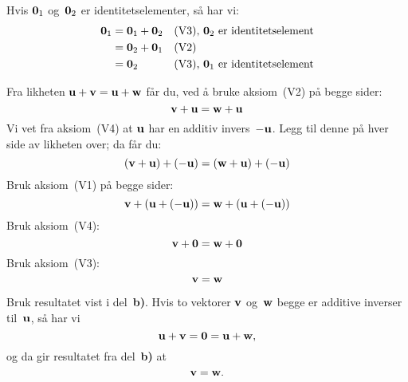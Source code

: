 \begin{losning}
\begin{punkt}
Hvis $\mathbf{0}_1$ og~$\mathbf{0}_2$ er identitetselementer, så har vi:
\begin{align*}
\mathbf{0}_1
 &= \mathbf{0}_1 + \mathbf{0}_2 &&\text{(V3), $\mathbf{0}_2$ er identitetselement} \\
 &= \mathbf{0}_2 + \mathbf{0}_1 &&\text{(V2)} \\
 &= \mathbf{0}_2           &&\text{(V3), $\mathbf{0}_1$ er identitetselement}
\end{align*}
\end{punkt}
\begin{punkt}
Fra likheten $\mathbf{u} + \mathbf{v} = \mathbf{u} + \mathbf{w}$ får du, ved å bruke
aksiom~(V2) på begge sider:
\[
\mathbf{v} + \mathbf{u} = \mathbf{w} + \mathbf{u}
\]
Vi vet fra aksiom~(V4) at $\mathbf{u}$ har en additiv invers~$-\mathbf{u}$.
Legg til denne på hver side av likheten over; da får du:
\[
(\mathbf{v} + \mathbf{u}) + (-\mathbf{u}) = (\mathbf{w} + \mathbf{u}) + (-\mathbf{u})
\]
Bruk aksiom~(V1) på begge sider:
\[
\mathbf{v} + (\mathbf{u} + (-\mathbf{u})) = \mathbf{w} + (\mathbf{u} + (-\mathbf{u}))
\]
Bruk aksiom~(V4):
\[
\mathbf{v} + \mathbf{0} = \mathbf{w} + \mathbf{0}
\]
Bruk aksiom~(V3):
\[
\mathbf{v} = \mathbf{w}
\]
\end{punkt}
\begin{punkt}
Bruk resultatet vist i del~\textbf{b)}.  Hvis to vektorer $\mathbf{v}$
og~$\mathbf{w}$ begge er additive inverser til~$\mathbf{u}$, så har vi
\[
\mathbf{u} + \mathbf{v} = \mathbf{0} = \mathbf{u} + \mathbf{w},
\]
og da gir resultatet fra del~\textbf{b)} at
\[
\mathbf{v} = \mathbf{w}.
\]
\end{punkt}
\end{losning}

